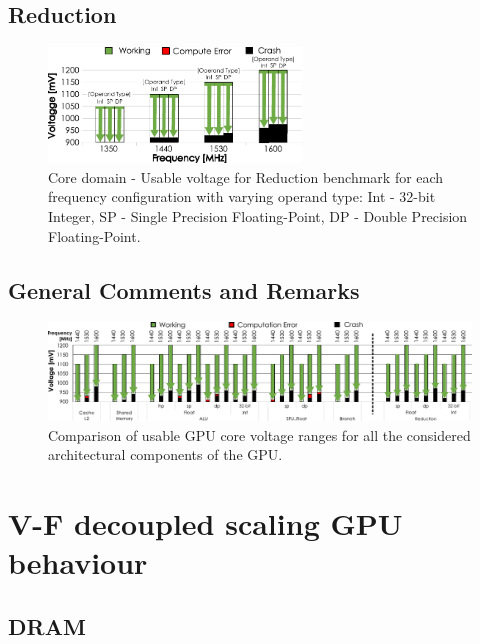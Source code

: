 \subsection{Reduction}

\begin{figure}[htb]
  \centering
  \includegraphics[width=0.6\textwidth]{Figures/GPU_characterization/Reduction_guardband.pdf}
  \caption{Core domain - Usable voltage for Reduction benchmark for each frequency configuration with varying operand type: Int - 32-bit Integer, SP - Single Precision Floating-Point, DP - Double Precision Floating-Point.}
  \label{fig:Reduction_guardband}
\end{figure}


\subsection{General Comments and Remarks}

\begin{figure}[h]
    \centering
        \includegraphics[width=1\textwidth]{Figures/GPU_characterization/Comparison_Guardband.pdf}
        \caption{Comparison of usable GPU core voltage ranges for all the considered architectural components of the GPU.}
    \label{fig:Guardband_comparison}
\end{figure}

\section{V-F decoupled scaling GPU behaviour}
\label{sec:gpu_behaviour}

\subsection{DRAM}

